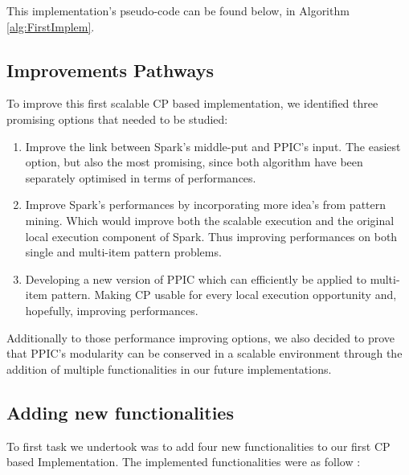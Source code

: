 \documentclass{eplmastersthesis}
\begin{document}
This implementation's pseudo-code can be found below, in Algorithm \ref{alg:FirstImplem}.

\subsection{Improvements Pathways}

To improve this first scalable CP based implementation, we identified three promising options that needed to be studied:

\begin{enumerate}
	\item Improve the link between Spark's middle-put and PPIC's input. The easiest option, but also the most promising, since both algorithm have been separately optimised in terms of performances.
	\item Improve Spark's performances by incorporating more idea's from pattern mining.
Which would improve both the scalable execution and the original local execution component of Spark. Thus improving performances on both single and multi-item pattern problems.
	\item Developing a new version of PPIC which can efficiently be applied to multi-item pattern. Making CP usable for every local execution opportunity and, hopefully, improving performances.
\end{enumerate}

Additionally to those performance improving options, we also decided to prove that PPIC's modularity can be conserved in a scalable environment through the addition of multiple  functionalities in our future implementations.

\subsection{Adding new functionalities}

To first task we undertook was to add four new functionalities to our first CP based Implementation. The implemented functionalities were as follow :
\end{document}
